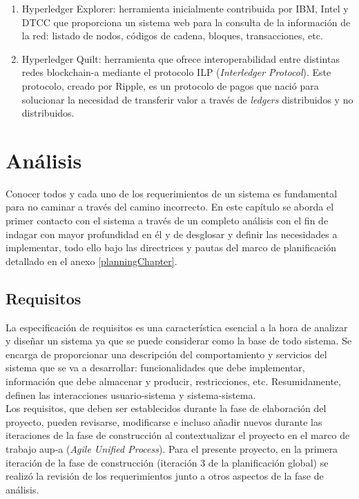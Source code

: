 \documentclass[12pt,a4paper, twoside]{report}
\begin{document}
\begin{enumerate}
		\item Hyperledger Explorer: herramienta inicialmente contribuida por IBM, Intel y DTCC que proporciona un sistema web para la consulta de la información de la red: listado de nodos, códigos de cadena, bloques, transacciones, etc.
		
		\item Hyperledger Quilt: herramienta que ofrece interoperabilidad entre distintas redes \gls{blockchain-a} mediante el protocolo ILP (\textit{Interledger Protocol}). Este protocolo, creado por Ripple, es un protocolo de pagos que nació para solucionar la necesidad de transferir valor a través de \textit{ledgers} distribuidos y no distribuidos.
	\end{enumerate}

	\chapter{Análisis} \label{analysisChapter}
		
	Conocer todos y cada uno de los requerimientos de un sistema es fundamental para no caminar a través del camino incorrecto. En este capítulo se aborda el primer contacto con el sistema a través de un completo análisis con el fin de indagar con mayor profundidad en él y de desglosar y definir las necesidades a implementar, todo ello bajo las directrices y pautas del marco de planificación detallado en el anexo \ref{planningChapter}.

	\section{Requisitos}

	La especificación de requisitos es una característica esencial a la hora de analizar y diseñar un sistema ya que se puede considerar como la base de todo sistema. Se encarga de proporcionar una descripción del comportamiento y servicios del sistema que se va a desarrollar: funcionalidades que debe implementar, información que debe almacenar y producir, restricciones, etc. Resumidamente, definen las interacciones usuario-sistema y sistema-sistema.\\
	
	Los requisitos, que deben ser establecidos durante la fase de elaboración del proyecto, pueden revisarse, modificarse e incluso añadir nuevos durante las iteraciones de la fase de construcción al contextualizar el proyecto en el marco de trabajo \gls{aup-a} (\textit{Agile Unified Process}). Para el presente proyecto, en la primera iteración de la fase de construcción (iteración 3 de la planificación global) se realizó la revisión de los requerimientos junto a otros aspectos de la fase de análisis.
\end{document}
